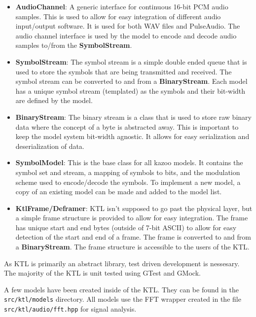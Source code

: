 \documentclass[]{article}
\begin{document}
\begin{itemize}
  \item \textbf{AudioChannel}: A generic interface for continuous 16-bit PCM audio samples. This is used to allow for easy integration of different audio input/output software. It is used for both WAV files and PulseAudio. The audio channel interface is used by the model to encode and decode audio samples to/from the \textbf{SymbolStream}.

  \item \textbf{SymbolStream}: The symbol stream is a simple double ended queue that is used to store the symbols that are being transmitted and received. The symbol stream can be converted to and from a \textbf{BinaryStream}. Each model has a unique symbol stream (templated) as the symbols and their bit-width are defined by the model.

  \item \textbf{BinaryStream}: The binary stream is a class that is used to store raw binary data where the concept of a byte is abstracted away. This is important to keep the model system bit-width agnostic. It allows for easy serialization and deserialization of data.

  \item \textbf{SymbolModel}: This is the base class for all kazoo models. It contains the symbol set and stream, a mapping of symbols to bits, and the modulation scheme used to encode/decode the symbols. To implement a new model, a copy of an existing model can be made and added to the model list.

  \item \textbf{KtlFrame/Deframer}: KTL isn't supposed to go past the physical layer, but a simple frame structure is provided to allow for easy integration. The frame has unique start and end bytes (outside of 7-bit ASCII) to allow for easy detection of the start and end of a frame. The frame is converted to and from a \textbf{BinaryStream}. The frame structure is accessible to the users of the KTL.

\end{itemize}


As KTL is primarily an abstract library, test driven development is nessesary. The majority of the KTL is unit tested using GTest and GMock.


A few models have been created inside of the KTL. They can be found in the \texttt{src/ktl/models} directory. All models use the FFT wrapper created in the file \texttt{src/ktl/audio/fft.hpp} for signal analysis.
\end{document}
